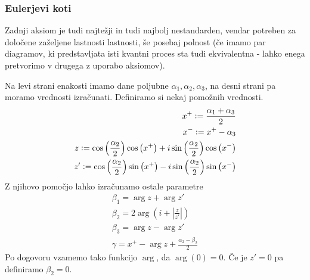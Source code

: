 \documentclass[mat1]{fmfdelo}
\newcommand{\defeq}{\vcentcolon=}
\begin{document}
\subsubsection{Eulerjevi koti} \label{euler}
Zadnji aksiom je tudi najtežji in tudi najbolj nestandarden, vendar potreben za določene zaželjene lastnosti lastnosti, še posebaj polnost (če imamo par diagramov, ki predstavljata isti kvantni proces sta tudi ekvivalentna - lahko enega pretvorimo v drugega z uporabo aksiomov). 
\begin{center}
\end{center}
Na levi strani enakosti imamo dane poljubne \(\alpha_1,\alpha_2,\alpha_3\), na desni strani pa moramo vrednosti izračunati. Definiramo si nekaj pomožnih vrednosti.
\begin{align*}
    x^+ \defeq \frac{\alpha_1 + \alpha_3}{2}\\
    x^- \defeq x^+-\alpha_3\\
    z \defeq \cos\left(\frac{\alpha_2}{2}\right)\cos\left(x^+\right) + i\sin\left(\frac{\alpha_2}{2}\right)\cos\left(x^-\right)\\
    z' \defeq \cos\left(\frac{\alpha_2}{2}\right)\sin\left(x^+\right) - i\sin\left(\frac{\alpha_2}{2}\right)\sin\left(x^-\right)
\end{align*}
Z njihovo pomočjo lahko izračunamo ostale parametre
\begin{align*}
    \beta_1 = \arg z + \arg z'\\
    \beta_2 = 2\arg\left(i+\left\lvert\frac{z}{z'}\right\rvert\right)\\
    \beta_3 = \arg z - \arg z'\\
    \gamma = x^+-\arg z + \frac{\alpha_2-\beta_2}{2}
\end{align*}
Po dogovoru vzamemo tako funkcijo \(\arg\), da \(\arg(0)=0\). Če je \(z'=0\) pa definiramo \(\beta_2 = 0\).
\end{document}

